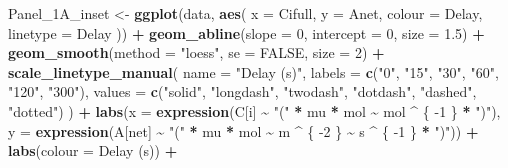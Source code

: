 \documentclass[
]{krantz}
\makeatletter
\newenvironment{Shaded}{\begin{snugshade}}{\end{snugshade}}
\newcommand{\DataTypeTok}[1]{\textcolor[rgb]{0.13,0.29,0.53}{#1}}
\newcommand{\DecValTok}[1]{\textcolor[rgb]{0.00,0.00,0.81}{#1}}
\newcommand{\FloatTok}[1]{\textcolor[rgb]{0.00,0.00,0.81}{#1}}
\newcommand{\KeywordTok}[1]{\textcolor[rgb]{0.13,0.29,0.53}{\textbf{#1}}}
\newcommand{\NormalTok}[1]{#1}
\newcommand{\OperatorTok}[1]{\textcolor[rgb]{0.81,0.36,0.00}{\textbf{#1}}}
\newcommand{\OtherTok}[1]{\textcolor[rgb]{0.56,0.35,0.01}{#1}}
\newcommand{\StringTok}[1]{\textcolor[rgb]{0.31,0.60,0.02}{#1}}
\newenvironment{kframe}{%
\medskip{}
\setlength{\fboxsep}{.8em}
 \def\at@end@of@kframe{}%
 \ifinner\ifhmode%
  \def\at@end@of@kframe{\end{minipage}}%
  \begin{minipage}{\columnwidth}%
 \fi\fi%
 \def\FrameCommand##1{\hskip\@totalleftmargin \hskip-\fboxsep
 \colorbox{shadecolor}{##1}\hskip-\fboxsep
     \hskip-\linewidth \hskip-\@totalleftmargin \hskip\columnwidth}%
 \MakeFramed {\advance\hsize-\width
   \@totalleftmargin\z@ \linewidth\hsize
   \@setminipage}}%
 {\par\unskip\endMakeFramed%
 \at@end@of@kframe}
\renewenvironment{Shaded}{\begin{kframe}}{\end{kframe}}
\makeatother
\begin{document}
\begin{Shaded}
\begin{Highlighting}[]
\NormalTok{Panel\_1A\_inset \textless{}{-}}
\StringTok{  }\KeywordTok{ggplot}\NormalTok{(data, }\KeywordTok{aes}\NormalTok{(}
    \DataTypeTok{x =}\NormalTok{ Cifull,}
    \DataTypeTok{y =}\NormalTok{ Anet,}
    \DataTypeTok{colour =}\NormalTok{ Delay,}
    \DataTypeTok{linetype =}\NormalTok{ Delay}
\NormalTok{  )) }\OperatorTok{+}
\StringTok{  }\KeywordTok{geom\_abline}\NormalTok{(}\DataTypeTok{slope =} \DecValTok{0}\NormalTok{,}
              \DataTypeTok{intercept =} \DecValTok{0}\NormalTok{,}
              \DataTypeTok{size =} \FloatTok{1.5}\NormalTok{) }\OperatorTok{+}
\StringTok{  }\KeywordTok{geom\_smooth}\NormalTok{(}\DataTypeTok{method =} \StringTok{"loess"}\NormalTok{, }\DataTypeTok{se =} \OtherTok{FALSE}\NormalTok{, }\DataTypeTok{size =} \DecValTok{2}\NormalTok{) }\OperatorTok{+}
\StringTok{  }\KeywordTok{scale\_linetype\_manual}\NormalTok{(}
    \DataTypeTok{name =} \StringTok{"Delay (s)"}\NormalTok{,}
    \DataTypeTok{labels =} \KeywordTok{c}\NormalTok{(}\StringTok{"0"}\NormalTok{, }\StringTok{"15"}\NormalTok{, }\StringTok{"30"}\NormalTok{, }\StringTok{"60"}\NormalTok{, }\StringTok{"120"}\NormalTok{, }\StringTok{"300"}\NormalTok{),}
    \DataTypeTok{values =} \KeywordTok{c}\NormalTok{(}\StringTok{"solid"}\NormalTok{, }\StringTok{"longdash"}\NormalTok{, }\StringTok{"twodash"}\NormalTok{, }\StringTok{"dotdash"}\NormalTok{, }\StringTok{"dashed"}\NormalTok{, }\StringTok{"dotted"}\NormalTok{)}
\NormalTok{  ) }\OperatorTok{+}
\StringTok{  }\KeywordTok{labs}\NormalTok{(}\DataTypeTok{x =} \KeywordTok{expression}\NormalTok{(C[i] }\OperatorTok{\textasciitilde{}}\StringTok{ "("} \OperatorTok{*}\StringTok{ }\NormalTok{mu }\OperatorTok{*}\StringTok{ }\NormalTok{mol }\OperatorTok{\textasciitilde{}}\StringTok{ }\NormalTok{mol }\OperatorTok{\^{}}\StringTok{ }\NormalTok{\{}
    \DecValTok{{-}1}
\NormalTok{  \} }\OperatorTok{*}\StringTok{ ")"}\NormalTok{),}
  \DataTypeTok{y =} \KeywordTok{expression}\NormalTok{(A[net] }\OperatorTok{\textasciitilde{}}\StringTok{ "("} \OperatorTok{*}\StringTok{ }\NormalTok{mu }\OperatorTok{*}\StringTok{ }\NormalTok{mol }\OperatorTok{\textasciitilde{}}\StringTok{ }\NormalTok{m }\OperatorTok{\^{}}\StringTok{ }\NormalTok{\{}
    \DecValTok{{-}2}
\NormalTok{  \} }\OperatorTok{\textasciitilde{}}\StringTok{ }\NormalTok{s }\OperatorTok{\^{}}\StringTok{ }\NormalTok{\{}
    \DecValTok{{-}1}
\NormalTok{  \} }\OperatorTok{*}\StringTok{ ")"}\NormalTok{)) }\OperatorTok{+}
\StringTok{  }\KeywordTok{labs}\NormalTok{(}\DataTypeTok{colour =} \StringTok{\textquotesingle{}Delay (s)\textquotesingle{}}\NormalTok{) }\OperatorTok{+}

\end{Highlighting}
\end{Shaded}
\end{document}
